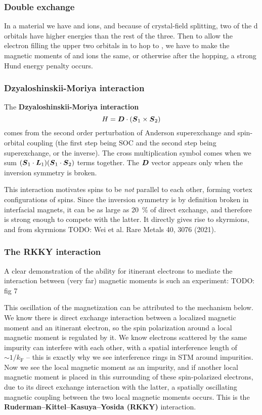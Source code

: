 \documentclass[hyperref, a4paper]{article}
\newcommand*{\concept}[1]{{\textbf{#1}}}
\begin{document}
\subsubsection{Double exchange}

In a material we have  and  ions,
and because of crystal-field splitting, 
two of the d orbitals have higher energies than the rest of the three. 
Then to allow the electron filling the upper two orbitals in 
to hop to ,
we have to make the magnetic moments of  and  ions the same, 
or otherwise after the hopping, 
a strong Hund energy penalty occurs. 

\subsubsection{Dzyaloshinskii-Moriya interaction}

The \concept{Dzyaloshinskii-Moriya interaction} 
\begin{equation}
    H = \vb*{D} \cdot (\vb*{S}_1 \times \vb*{S}_2)
\end{equation}
comes from 
the second order perturbation 
of Anderson superexchange and spin-orbital coupling
(the first step being SOC and the second step being superexchange,
or the inverse). 
The cross multiplication symbol comes 
when we sum $(\vb*{S}_1 \cdot \vb*{L}_1) (\vb*{S}_1 \cdot \vb*{S}_2)$ terms together.
The $\vb*{D}$ vector appears only when the inversion symmetry is broken. 

This interaction motivates 
spins to be \emph{not} parallel to each other, 
forming vortex configurations of spins. 
Since the inversion symmetry is by definition broken 
in interfacial magnets, 
it can be as large as \SI{20}{\percent} of direct exchange,
and therefore is strong enough to compete with the latter. 
It directly gives rise to skyrmions, 
and from skyrmions TODO: Wei et al. Rare Metals 40, 3076 (2021).

\subsubsection{The RKKY interaction}

A clear demonstration of the ability for itinerant electrons 
to mediate the interaction between (very far) magnetic moments 
is such an experiment: 
TODO: fig 7

This oscillation of the magnetization can be attributed to the mechanism below.
We know there is direct exchange interaction 
between a localized magnetic moment and an itinerant electron, 
so the spin polarization around a local magnetic moment 
is regulated by it. 
We know electrons scattered by the same impurity can interfere with each other, 
with a spatial interference length of $\sim 1 / k_{\text{F}}$ -- 
this is exactly why we see interference rings in STM around impurities. 
Now we see the local magnetic moment as an impurity,
and if another local magnetic moment 
is placed in this surrounding of these spin-polarized electrons, 
due to its direct exchange interaction with the latter, 
a spatially oscillating magnetic coupling between the two local magnetic moments occurs. 
This is the \concept{Ruderman–Kittel–Kasuya–Yosida (RKKY)} interaction. 
\end{document}

